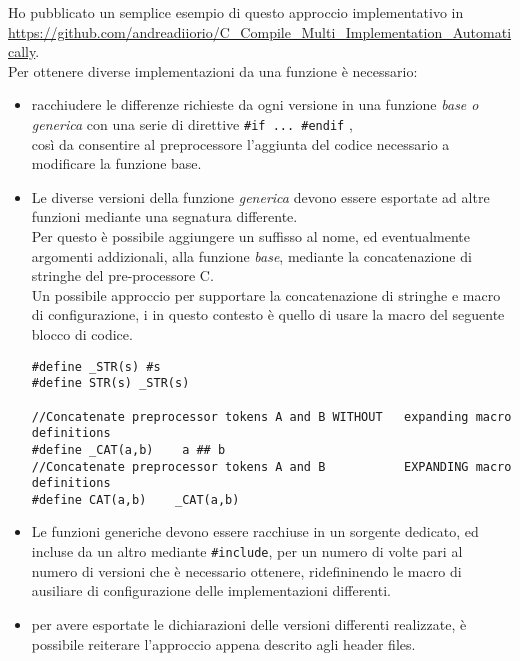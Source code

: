 Ho pubblicato un semplice esempio di questo approccio implementativo in \url{https://github.com/andreadiiorio/C_Compile_Multi_Implementation_Automatically}.\\
Per ottenere diverse implementazioni da una funzione è necessario:
\begin{itemize}
	\item	racchiudere le differenze richieste da ogni versione in una funzione \emph{base o generica} con una serie di direttive \verb|#if ... #endif| ,\\
			così da consentire al preprocessore l'aggiunta del codice necessario a modificare la funzione base.%
	\item	Le diverse versioni della funzione \emph{generica} devono essere esportate ad altre funzioni mediante una segnatura differente.\\
			Per questo è possibile aggiungere un  suffisso al nome, ed eventualmente argomenti addizionali, alla funzione 
			\emph{base}, mediante la concatenazione di stringhe del pre-processore C.\\
			Un possibile approccio per supportare la concatenazione di stringhe e macro di configurazione, i
			in questo contesto è quello di usare la macro  del seguente blocco di codice.\\
			\begin{lstlisting}
#define _STR(s) #s
#define STR(s) _STR(s)

//Concatenate preprocessor tokens A and B WITHOUT   expanding macro definitions
#define _CAT(a,b)    a ## b
//Concatenate preprocessor tokens A and B           EXPANDING macro definitions
#define CAT(a,b)    _CAT(a,b)
			\end{lstlisting}
	\item	Le funzioni generiche devono essere racchiuse in un sorgente dedicato, ed incluse da un altro mediante \verb|#include|,
			per un numero di volte pari al numero di versioni che è necessario ottenere,
			ridefininendo le macro di ausiliare di configurazione delle implementazioni differenti.
	\item	per avere esportate le dichiarazioni delle versioni differenti realizzate, è possibile reiterare l'approccio 
			appena descrito agli header files.
\end{itemize}
 
